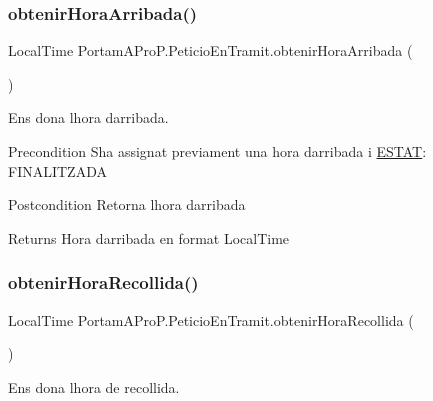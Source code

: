 \subsubsection{\texorpdfstring{obtenir\+Hora\+Arribada()}{obtenirHoraArribada()}}
{\footnotesize\ttfamily Local\+Time Portam\+A\+Pro\+P.\+Peticio\+En\+Tramit.\+obtenir\+Hora\+Arribada (\begin{DoxyParamCaption}{ }\end{DoxyParamCaption})}



Ens dona l\textquotesingle{}hora d\textquotesingle{}arribada. 

\begin{DoxyPrecond}{Precondition}
S\textquotesingle{}ha assignat previament una hora d\textquotesingle{}arribada i \hyperlink{enum_portam_a_pro_p_1_1_peticio_en_tramit_1_1_e_s_t_a_t}{E\+S\+T\+AT}\+: F\+I\+N\+A\+L\+I\+T\+Z\+A\+DA 
\end{DoxyPrecond}
\begin{DoxyPostcond}{Postcondition}
Retorna l\textquotesingle{}hora d\textquotesingle{}arribada 
\end{DoxyPostcond}
\begin{DoxyReturn}{Returns}
Hora d\textquotesingle{}arribada en format Local\+Time 
\end{DoxyReturn}
\mbox{\label{class_portam_a_pro_p_1_1_peticio_en_tramit_afe2c9c5abe581786efdb4fb6495470ec}} 
\subsubsection{\texorpdfstring{obtenir\+Hora\+Recollida()}{obtenirHoraRecollida()}}
{\footnotesize\ttfamily Local\+Time Portam\+A\+Pro\+P.\+Peticio\+En\+Tramit.\+obtenir\+Hora\+Recollida (\begin{DoxyParamCaption}{ }\end{DoxyParamCaption})}



Ens dona l\textquotesingle{}hora de recollida. 

